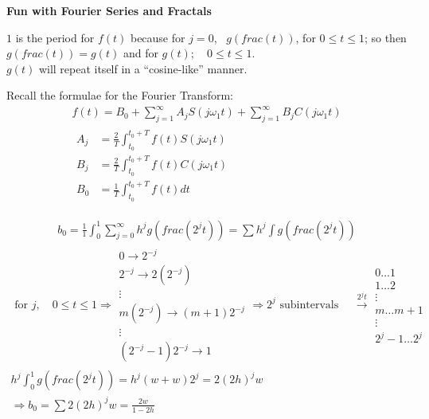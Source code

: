 \documentclass[twoside,10pt]{amsart}
\newcommand{\problemhead}[1]
  {\smallskip
   \noindent{\large\bf Problem #1.}
   \smallskip}
\begin{document}
\problemhead{6.4} \textbf{ Fun with Fourier Series and Fractals}

$1$ is the period for $f(t)$ because for $j=0$, \, $g(frac(t))$, for $0 \leq t \leq 1$; so then $g(frac(t)) = g(t)$ and for $g(t); \quad 0 \leq t \leq 1$.  \\
$g(t)$ will repeat itself in a ``cosine-like'' manner.  

Recall the formulae for the Fourier Transform:
\[
\begin{gathered}
  f(t) = B_0 + \sum_{j=1}^{\infty} A_j S(j\omega_1 t) + \sum_{j=1}^{\infty} B_j C(j \omega_1 t) \\
  \begin{aligned}
  A_j & = \frac{2}{T} \int_{t_0}^{t_0 + T} f(t)S(j\omega_1 t) \\
  B_j & = \frac{2}{T} \int_{t_0}^{t_0 + T} f(t)C(j \omega_1 t) \\
  B_0 & = \frac{1}{T} \int_{t_0}^{t_0 + T} f(t) dt 
  \end{aligned}
\end{gathered}
\]

\[
\begin{gathered}
  b_0 = \frac{1}{1} \int_0^1 \sum_{j=0}^{\infty} h^j g(frac(2^j t)) = \sum h^j \int g(frac(2^j t)) 
\end{gathered}
\]
\[
\begin{gathered}
 \text{ for } j, \quad 0 \leq t \leq 1 \Longrightarrow \begin{matrix} 
    0 \to 2^{-j} \\
    2^{-j} \to 2 (2^{-j}) \\
    \vdots \\
    m(2^{-j}) \to (m+1)2^{-j} \\
    \vdots \\
    (2^{-j} - 1)2^{-j} \to 1 
\end{matrix} \Longrightarrow 2^j \text{ subintervals } \quad \xrightarrow{2^j t} \begin{matrix} 
    0 \dots 1 \\
    1 \dots 2 \\
    \vdots \\
    m \dots m+1 \\
    \vdots \\
    2^j - 1 \dots 2^j 
  \end{matrix}  \\
h^j \int_0^1 g(frac(2^j t)) = h^j (w+w)2^j = 2 (2h)^j w \\
\Longrightarrow b_0 = \sum 2 (2h)^j w = \frac{2w}{ 1 - 2 h }
\end{gathered}
\]
\end{document}
